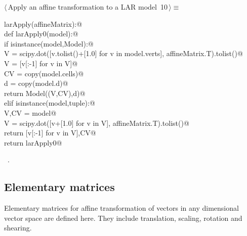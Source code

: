\documentclass[11pt,oneside]{article}	%
\begin{document}
\begin{flushleft} \small \label{scrap20}
\protect{}$\langle\,$Apply an affine transformation to a LAR model\nobreak\ {\footnotesize 10}$\,\rangle\equiv$
\vspace{-1ex}
\begin{list}{}{} \item
\mbox{}\verb@def larApply(affineMatrix):@\\
\mbox{}\verb@   def larApply0(model):@\\
\mbox{}\verb@      if isinstance(model,Model):@\\
\mbox{}\verb@         V = scipy.dot([v.tolist()+[1.0] for v in model.verts], affineMatrix.T).tolist()@\\
\mbox{}\verb@         V = [v[:-1] for v in V]@\\
\mbox{}\verb@         CV = copy(model.cells)@\\
\mbox{}\verb@         d = copy(model.d)@\\
\mbox{}\verb@         return Model((V,CV),d)@\\
\mbox{}\verb@      elif isinstance(model,tuple):@\\
\mbox{}\verb@         V,CV = model@\\
\mbox{}\verb@         V = scipy.dot([v+[1.0] for v in V], affineMatrix.T).tolist()@\\
\mbox{}\verb@         return [v[:-1] for v in V],CV@\\
\mbox{}\verb@   return larApply0@\\
\mbox{}\verb@@{\NWsep}
\end{list}
\vspace{-1ex}
\footnotesize\addtolength{\baselineskip}{-1ex}
\begin{list}{}{\setlength{\itemsep}{-\parsep}\setlength{\itemindent}{-\leftmargin}}
\item \NWtxtMacroRefIn\ .
\end{list}
\end{flushleft}


\subsection{Elementary matrices}
Elementary matrices for affine transformation of vectors in any dimensional vector space are defined here. They include translation, scaling, rotation and shearing. 
\end{document}
